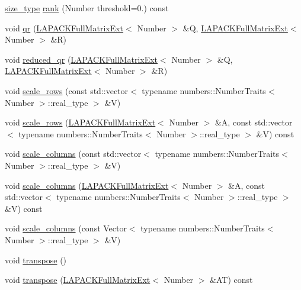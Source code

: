 \begin{DoxyCompactItemize}
\item 
\hyperlink{classLAPACKFullMatrixExt_a5cf5f4a6104dc17029210b5ca52bf574}{size\+\_\+type} \hyperlink{classLAPACKFullMatrixExt_a94f6a6df2b48201549f58bcbadcc6053}{rank} (Number threshold=0.) const
\item 
void \hyperlink{classLAPACKFullMatrixExt_a0413f3b6186f8e8fc0f2cb2e0cb5cc42}{qr} (\hyperlink{classLAPACKFullMatrixExt}{L\+A\+P\+A\+C\+K\+Full\+Matrix\+Ext}$<$ Number $>$ \&Q, \hyperlink{classLAPACKFullMatrixExt}{L\+A\+P\+A\+C\+K\+Full\+Matrix\+Ext}$<$ Number $>$ \&R)
\item 
void \hyperlink{classLAPACKFullMatrixExt_a2d29694b336c319402fd867658a25253}{reduced\+\_\+qr} (\hyperlink{classLAPACKFullMatrixExt}{L\+A\+P\+A\+C\+K\+Full\+Matrix\+Ext}$<$ Number $>$ \&Q, \hyperlink{classLAPACKFullMatrixExt}{L\+A\+P\+A\+C\+K\+Full\+Matrix\+Ext}$<$ Number $>$ \&R)
\item 
void \hyperlink{classLAPACKFullMatrixExt_aae9a6124afe70d17335d6338f323f22a}{scale\+\_\+rows} (const std\+::vector$<$ typename numbers\+::\+Number\+Traits$<$ Number $>$\+::real\+\_\+type $>$ \&V)
\item 
void \hyperlink{classLAPACKFullMatrixExt_a88b31beb3170825867a0b15b59770d61}{scale\+\_\+rows} (\hyperlink{classLAPACKFullMatrixExt}{L\+A\+P\+A\+C\+K\+Full\+Matrix\+Ext}$<$ Number $>$ \&A, const std\+::vector$<$ typename numbers\+::\+Number\+Traits$<$ Number $>$\+::real\+\_\+type $>$ \&V) const
\item 
void \hyperlink{classLAPACKFullMatrixExt_a75b2bb9434eb015f756747b943669fd7}{scale\+\_\+columns} (const std\+::vector$<$ typename numbers\+::\+Number\+Traits$<$ Number $>$\+::real\+\_\+type $>$ \&V)
\item 
void \hyperlink{classLAPACKFullMatrixExt_a2510d3bd30956bb2831b960796d3abca}{scale\+\_\+columns} (\hyperlink{classLAPACKFullMatrixExt}{L\+A\+P\+A\+C\+K\+Full\+Matrix\+Ext}$<$ Number $>$ \&A, const std\+::vector$<$ typename numbers\+::\+Number\+Traits$<$ Number $>$\+::real\+\_\+type $>$ \&V) const
\item 
void \hyperlink{classLAPACKFullMatrixExt_ab6e19be9ab53b4a38ba0d47a3b5f3daa}{scale\+\_\+columns} (const Vector$<$ typename numbers\+::\+Number\+Traits$<$ Number $>$\+::real\+\_\+type $>$ \&V)
\item 
void \hyperlink{classLAPACKFullMatrixExt_ac46d71bc1b0288fce7ad44b222e9210b}{transpose} ()
\item 
void \hyperlink{classLAPACKFullMatrixExt_a12a95aeff6e93f0284c59cffd0fb7b8e}{transpose} (\hyperlink{classLAPACKFullMatrixExt}{L\+A\+P\+A\+C\+K\+Full\+Matrix\+Ext}$<$ Number $>$ \&AT) const

\end{DoxyCompactItemize}
